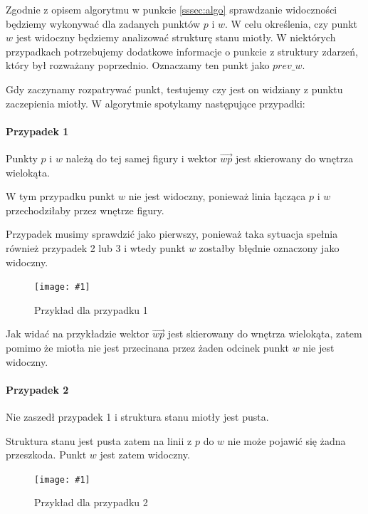 \documentclass[12pt]{article}
\newcommand{\imgcustomsize}[3]{
	\begin{figure}[H]
		\centering
		\texttt{[image: \#1]}
		\caption{#2}
		\label{#1}
	\end{figure}
}
\newcommand{\img}[2]{\imgcustomsize{#1}{#2}{0.5}}
\begin{document}
			Zgodnie z opisem algorytmu w punkcie \ref{sssec:algo} sprawdzanie widoczności będziemy wykonywać dla zadanych punktów $ p $ i $ w $. W celu określenia, czy punkt $ w $ jest widoczny będziemy analizować strukturę stanu miotły. W niektórych przypadkach potrzebujemy dodatkowe informacje o punkcie z struktury zdarzeń, który był rozważany poprzednio. Oznaczamy ten punkt jako $ prev\_w $.
			
			\vspace{\baselineskip} %
			Gdy zaczynamy rozpatrywać punkt, testujemy czy jest on widziany z punktu zaczepienia miotły.  W algorytmie spotykamy następujące przypadki:
			
			\paragraph{Przypadek 1}
			Punkty $ p $ i $ w $ należą do tej samej figury i wektor $ \overrightarrow{wp} $ jest skierowany do wnętrza wielokąta.
			
			
			\vspace{\baselineskip} %
			W tym przypadku punkt $ w $ nie jest widoczny, ponieważ linia łącząca $ p $ i $ w $ przechodziłaby przez wnętrze figury.
			
			\vspace{\baselineskip} %
			Przypadek musimy sprawdzić jako pierwszy, ponieważ taka sytuacja spełnia również przypadek 2 lub 3 i wtedy punkt $ w $ zostałby błędnie oznaczony jako widoczny.
			
			
			\img{przypadek1.jpg}{Przykład dla przypadku 1}
			
			Jak widać na przykładzie wektor $ \overrightarrow{wp} $ jest skierowany do wnętrza wielokąta, zatem pomimo że miotła nie jest przecinana przez żaden odcinek punkt $ w $ nie jest widoczny.
			
			\pagebreak
			\paragraph{Przypadek 2}
			Nie zaszedł przypadek 1 i struktura stanu miotły jest pusta.
			
			\vspace{\baselineskip} %
			Struktura stanu jest pusta zatem na linii z $ p $ do $ w $ nie może pojawić się żadna przeszkoda. Punkt $ w $ jest zatem widoczny.
			
			\img{przypadek2.jpg}{Przykład dla przypadku 2}
			
			\vspace{\baselineskip}
\end{document}
